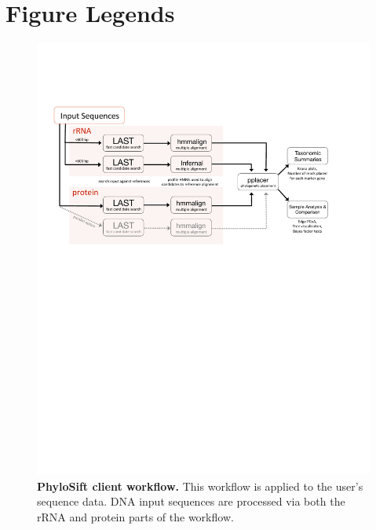 \documentclass[10pt]{article}
\begin{document}
\section*{Figure Legends}
\begin{figure}[hp]
\begin{center}
\includegraphics[width=6.5in]{figures/Phylosift_overview_oct2012_vector.pdf}
\end{center}
\caption{\textbf{PhyloSift client workflow.} This workflow is applied to the user's sequence data. DNA input sequences are processed via both the rRNA and protein parts of the workflow.}
\label{fig:overview}
\end{figure}
\end{document}
